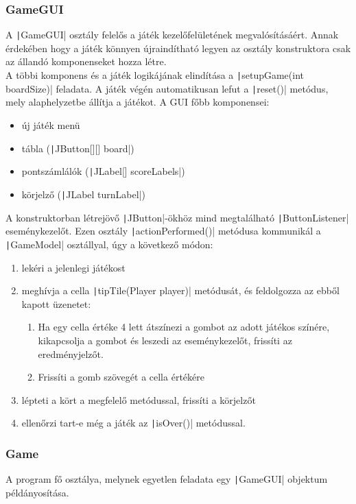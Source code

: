 \documentclass[a4paper,12pt]{article}
\begin{document}
	\subsubsection{GameGUI}
	A \texttt|GameGUI| osztály felelős a játék kezelőfelületének megvalósításáért. Annak érdekében hogy a játék könnyen újraindítható legyen az osztály konstruktora csak az állandó komponenseket hozza létre. \\[4pt]
	A többi komponens és a játék logikájának elindítása a \texttt|setupGame(int boardSize)| feladata. A játék végén automatikusan lefut a \texttt|reset()| metódus, mely alaphelyzetbe állítja a játékot.
	A GUI főbb komponensei:
	\begin{itemize}
		\item új játék menü
		\item tábla (\texttt|JButton[][] board|)
		\item pontszámlálók (\texttt|JLabel[] scoreLabels|)
		\item körjelző (\texttt|JLabel turnLabel|)
	\end{itemize}
	A konstruktorban létrejövő \texttt|JButton|-ökhöz mind megtalálható \texttt|ButtonListener| eseménykezelőt. Ezen osztály \texttt|actionPerformed()| metódusa kommunikál a \texttt|GameModel| osztállyal, úgy a következő módon:
	\begin{enumerate}
		\item lekéri a jelenlegi játékost
		\item meghívja a cella \texttt|tipTile(Player player)| metódusát, és feldolgozza az ebből kapott üzenetet:
		\begin{enumerate}
			\item Ha egy cella értéke 4 lett átszínezi a gombot az adott játékos színére, kikapcsolja a gombot és leszedi az eseménykezelőt, frissíti az eredményjelzőt.
			\item Frissíti a gomb szövegét a cella értékére
		\end{enumerate}
		\item lépteti a kört a megfelelő metódussal, frissíti a körjelzőt
		\item ellenőrzi tart-e még a játék az \texttt|isOver()| metódussal.
	\end{enumerate}
	
	\subsubsection{Game}
	A program fő osztálya, melynek egyetlen feladata egy \texttt|GameGUI| objektum példányosítása.
\end{document}
